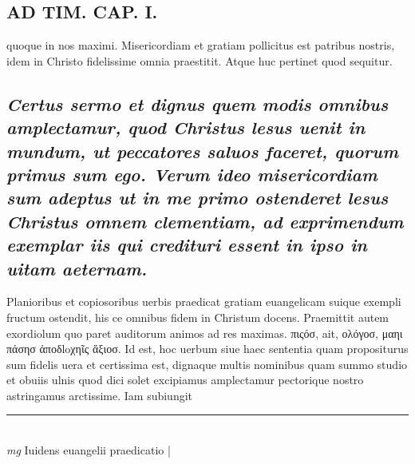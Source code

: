 \documentclass{article}
\begin{document}
\begin{pages}
\section*{AD TIM. CAP. I. }
\marginpar{[ p.104 ]}\pstart quoque in nos maximi. Misericordiam et gratiam pollicitus est patribus nostris, idem in Christo fidelissime omnia praestitit. Atque huc pertinet quod sequitur.  \pend
{}
{}
\subsection*{\textit{Certus sermo et dignus quem modis omnibus amplectamur, quod  Christus lesus uenit in mundum, ut peccatores saluos faceret, quorum primus sum ego. Verum ideo misericordiam sum adeptus ut in me primo ostenderet lesus Christus omnem clementiam, ad exprimendum exemplar iis qui credituri essent in ipso in uitam aeternam. }}\pstart Planioribus et copiosoribus uerbis praedicat gratiam euangelicam suique exempli fructum ostendit, his ce omnibus fidem in Christum docens. Praemittit autem exordiolum quo paret auditorum animos ad res maximas. πιςόσ, ait, ολόγοσ, μαηι πάσησ ἀποδloχηῖς ἄξιοσ. Id est, hoc uerbum siue haec sententia quam propositurus sum fidelis uera et certissima est, dignaque multis nominibus quam summo studio et obuiis ulnis quod dici solet excipiamus amplectamur pectorique nostro astringamus arctissime. Iam subiungit  \pend
\vspace{0.5cm}\noindent
\vspace{0.2cm}\rule{1cm}{0.2pt}\\ 
\hspace{0.2cm}\textit{mg}
\footnotesize Iuidens euangelii praedicatio 
\normalsize| 

\end{pages}
\end{document}
